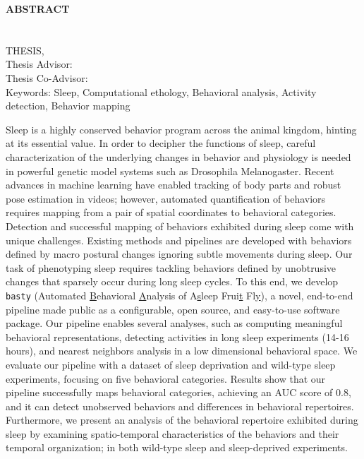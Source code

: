 \clearpage
\begin{center}
	\MakeUppercase{\textbf{Abstract}} \\ [3\baselineskip]
	\MakeUppercase{\thesistitle} \\[3\baselineskip]
	\MakeUppercase{\student} \\[\baselineskip]
	\MakeUppercase{\major \degreeabv Thesis, \month~\year} \\[\baselineskip]
	Thesis Advisor: \advisor \\
	Thesis Co-Advisor: \coadvisor \\
	[2\baselineskip]
	Keywords: Sleep, Computational ethology, Behavioral analysis, Activity detection, Behavior mapping \\[2\baselineskip]
\end{center}

\singlespacing

Sleep is a highly conserved behavior program across the animal kingdom, hinting at its essential value.
In order to decipher the functions of sleep, careful characterization of the underlying changes in behavior and physiology is needed in powerful genetic model systems such as Drosophila Melanogaster.
Recent advances in machine learning have enabled tracking of body parts and robust pose estimation in videos; however, automated quantification of behaviors requires mapping from a pair of spatial coordinates to behavioral categories.
Detection and successful mapping of behaviors exhibited during sleep come with unique challenges.
Existing methods and pipelines are developed with behaviors defined by macro postural changes ignoring subtle movements during sleep.
Our task of phenotyping sleep requires tackling behaviors defined by unobtrusive changes that sparsely occur during long sleep cycles.
To this end, we develop \texttt{basty} (Automated \underline{B}ehavioral \underline{A}nalysis of A\underline{s}leep Frui\underline{t} Fl\underline{y}), a novel, end-to-end pipeline made public as a configurable, open source, and easy-to-use software package.
Our pipeline enables several analyses, such as computing meaningful behavioral representations, detecting activities in long sleep experiments (14-16 hours), and nearest neighbors analysis in a low dimensional behavioral space.
We evaluate our pipeline with a dataset of sleep deprivation and wild-type sleep experiments, focusing on five behavioral categories.
Results show that our pipeline successfully maps behavioral categories, achieving an AUC score of 0.8, and it can detect unobserved behaviors and differences in behavioral repertoires.
Furthermore, we present an analysis of the behavioral repertoire exhibited during sleep by examining spatio-temporal characteristics of the behaviors and their temporal organization; in both wild-type sleep and sleep-deprived experiments.

